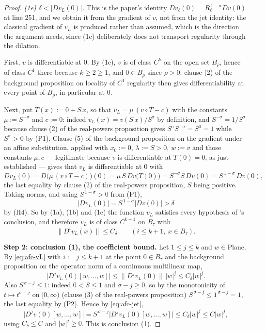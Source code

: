 \begin{proof}
\emph{(1e) $\delta<\lvert Dv_L(0)\rvert$.}  This is the paper's identity
$Dv_\ell(0)=R_\ell^{\,1-\sigma}Dv(0)$ at line 251, and we obtain it from the gradient of $v$,
not from the jet identity: the classical gradient of $v_L$ is produced rather than assumed,
which is the direction the argument needs, since (1c) deliberately does not transport
regularity through the dilation.

First, $v$ is differentiable at $0$.  By (1c), $v$ is of class $C^{k}$ on the open set
$B_\rho$, hence of class $C^{1}$ there because $k\ge2\ge1$, and $0\in B_\rho$ since $\rho>0$;
clause (2) of the background proposition on locality of $C^{1}$ regularity then gives
differentiability at every point of $B_\rho$, in particular at $0$.

Next, put $T(x):=0+S\,x$, so that $v_L=\mu\,(v\circ T-c)$ with the constants
$\mu:=S^{-\sigma}$ and $c:=0$: indeed $v_L(x)=v(S\,x)/S^{\sigma}$ by definition, and
$S^{-\sigma}=1/S^{\sigma}$ because clause (2) of the real-powers proposition gives
$S^{\sigma}S^{-\sigma}=S^{0}=1$ while $S^{\sigma}>0$ by (P1).  Clause (5) of the background
proposition on the gradient under an affine substitution, applied with $x_0:=0$,
$\lambda:=S>0$, $w:=v$ and those constants $\mu,c$ --- legitimate because $v$ is differentiable
at $T(0)=0$, as just established --- gives that $v_L$ is differentiable at $0$ with
\[
  Dv_L(0)=D\bigl(\mu\,(v\circ T-c)\bigr)(0)=\mu\,S\,Dv\bigl(T(0)\bigr)
  =S^{-\sigma}S\,Dv(0)=S^{\,1-\sigma}\,Dv(0),
\]
the last equality by clause (2) of the real-powers proposition, $S$ being positive.  Taking
norms, and using $S^{\,1-\sigma}>0$ from (P1),
\[
  \lvert Dv_L(0)\rvert=S^{\,1-\sigma}\lvert Dv(0)\rvert>\delta
\]
by (H4).  So by (1a), (1b) and (1e) the function $v_L$ satisfies every hypothesis of
's conclusion, and therefore $v_L$ is of class $C^{k+1}$ on $B_\tau$ with
\begin{equation}\label{eq:afc-vL}
  \bigl\lVert D^{i}v_L(x)\bigr\rVert\le C_\delta\qquad(i\le k+1,\ x\in B_\tau).
\end{equation}

\medskip\noindent\textbf{Step 2: conclusion (1), the coefficient bound.}
Let $1\le j\le k$ and $w\in\mathrm{Plane}$.  By \eqref{eq:afc-vL} with $i:=j\le k+1$ at the
point $0\in B_\tau$ and the background proposition on the operator norm of a continuous
multilinear map,
\[
  \bigl\lvert D^{j}v_L(0)[w,\ldots,w]\bigr\rvert\le\bigl\lVert D^{j}v_L(0)\bigr\rVert\,
  \lvert w\rvert^{j}\le C_\delta\lvert w\rvert^{j}.
\]
Also $S^{\,\sigma-j}\le1$: indeed $0<S\le1$ and $\sigma-j\ge0$, so by the monotonicity of
$t\mapsto t^{\sigma-j}$ on $[0,\infty)$ (clause (3) of the real-powers proposition)
$S^{\,\sigma-j}\le1^{\,\sigma-j}=1$, the last equality by (P2).  Hence by \eqref{eq:afc-jet},
\[
  \bigl\lvert D^{j}v(0)[w,\ldots,w]\bigr\rvert
  =S^{\,\sigma-j}\bigl\lvert D^{j}v_L(0)[w,\ldots,w]\bigr\rvert
  \le C_\delta\lvert w\rvert^{j}\le C\lvert w\rvert^{j},
\]
using $C_\delta\le C$ and $\lvert w\rvert^{j}\ge0$.  This is conclusion (1).


\end{proof}

